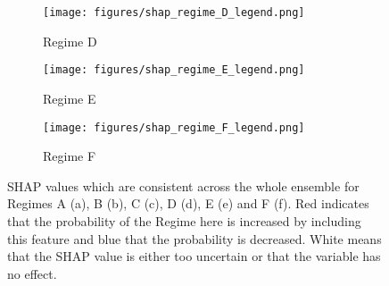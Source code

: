 \documentclass[a4paper]{article}
\begin{document}
\begin{sidewaysfigure}
\ContinuedFloat
\begin{subfigure}{\textwidth}
    \centering
    \texttt{[image: figures/shap\_regime\_D\_legend.png]}
    \caption{Regime D}
    \label{fig:shap_reg_D}
\end{subfigure}
\begin{subfigure}{\textwidth}
    \centering
    \texttt{[image: figures/shap\_regime\_E\_legend.png]}
    \caption{Regime E}
    \label{fig:shap_reg_E}
\end{subfigure}
\begin{subfigure}{\textwidth}
    \centering
    \texttt{[image: figures/shap\_regime\_F\_legend.png]}
    \caption{Regime F}
    \label{fig:shap_reg_F}
\end{subfigure}
\caption{SHAP values which are consistent across the whole ensemble for Regimes A (a), B (b), C (c), D (d), E (e) and F (f). Red indicates that the probability of the Regime here is increased by including this feature and blue that the probability is decreased. White means that the SHAP value is either too uncertain or that the variable has no effect.}\label{SHAP_fig_2}
\end{sidewaysfigure}
\end{document}
